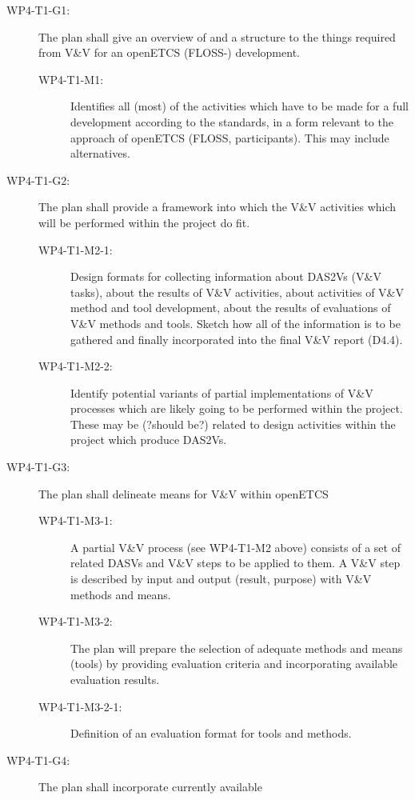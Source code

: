 \begin{description}
\item[WP4-T1-G1:] The plan shall give an overview of and a structure to
  the things required from V\&V for an openETCS (FLOSS-) development.
  \begin{description}
  \item[WP4-T1-M1:] Identifies all (most) of the activities which have
    to be made for a full development according to the standards, in a
    form relevant to the approach of openETCS (FLOSS,
    participants). This may include alternatives.
  \end{description}
\item[WP4-T1-G2:] The plan shall provide a framework into which the V\&V
  activities which will be performed within the project do fit.
  \begin{description}
  \item[WP4-T1-M2-1:] Design formats for collecting information about
    DAS2Vs (V\&V tasks), about the results of V\&V activities, about
    activities of V\&V method and tool development, about the results
    of evaluations of V\&V methods and tools. Sketch how all of the
    information is to be gathered and finally incorporated into the
    final V\&V report (D4.4).
  \item[WP4-T1-M2-2:] Identify potential variants of partial
    implementations of V\&V processes which are likely going to be
    performed within the project. These may be (?should be?) related
    to design activities within the project which produce DAS2Vs.
  \end{description}
\item[WP4-T1-G3:] The plan shall delineate means for V\&V within openETCS
  \begin{description}
  \item[WP4-T1-M3-1:] A partial V\&V process (see WP4-T1-M2 above)
    consists of a set of related DASVs and V\&V steps to be applied to
    them. A V\&V step is described by input and output (result,
    purpose) with V\&V methods and means.
  \item[WP4-T1-M3-2:] The plan will prepare the selection of adequate
    methods and means (tools) by providing evaluation criteria and
    incorporating available evaluation results.
  \item[WP4-T1-M3-2-1:] Definition of an evaluation format for tools
    and methods.
  \end{description}
\item[WP4-T1-G4:] The plan shall incorporate currently available

\end{description}

